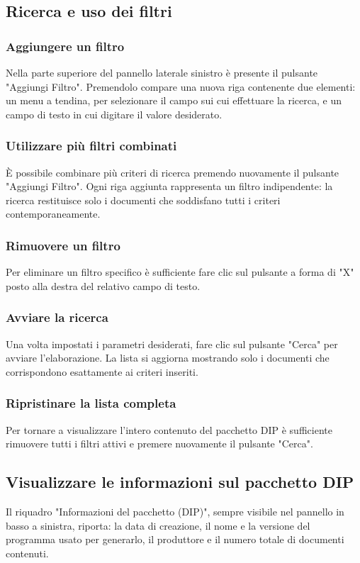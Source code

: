 \documentclass[a4paper,12pt]{article}
\begin{document}
        \subsection{Ricerca e uso dei filtri}
            \label{sec:filtri}
            \subsubsection{Aggiungere un filtro}
            Nella parte superiore del pannello laterale sinistro è presente il pulsante "Aggiungi Filtro". Premendolo compare una nuova riga contenente due elementi: un menu a tendina, per selezionare il campo sui cui effettuare la ricerca, e un campo di testo in cui digitare il valore desiderato.

            \subsubsection{Utilizzare più filtri combinati}
            È possibile combinare più criteri di ricerca premendo nuovamente il pulsante "Aggiungi Filtro". Ogni riga aggiunta rappresenta un filtro indipendente: la ricerca restituisce solo i documenti che soddisfano tutti i criteri contemporaneamente.

            \subsubsection{Rimuovere un filtro}
            Per eliminare un filtro specifico è sufficiente fare clic sul pulsante a forma di "X" posto alla destra del relativo campo di testo.

            \subsubsection{Avviare la ricerca}
            Una volta impostati i parametri desiderati, fare clic sul pulsante "Cerca" per avviare l'elaborazione. La lista si aggiorna mostrando solo i documenti che corrispondono esattamente ai criteri inseriti.

            \subsubsection{Ripristinare la lista completa}
            Per tornare a visualizzare l'intero contenuto del pacchetto DIP è sufficiente rimuovere tutti i filtri attivi e premere nuovamente il pulsante "Cerca".
            
        \subsection{Visualizzare le informazioni sul pacchetto DIP}
        Il riquadro "Informazioni del pacchetto (DIP)", sempre visibile nel pannello in basso a sinistra, riporta: la data di creazione, il nome e la versione del programma usato per generarlo, il produttore e il numero totale di documenti contenuti.
\end{document}
